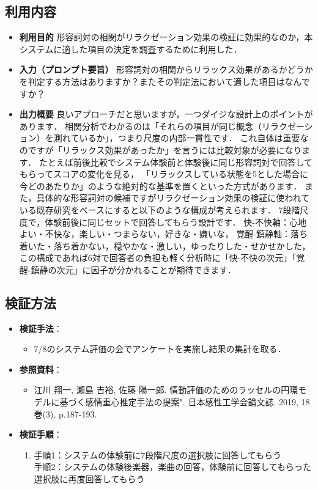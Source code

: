 \documentclass[a4paper,12pt]{ltjsarticle}
\begin{document}
\subsection{利用内容}
\begin{itemize}
  \item \textbf{利用目的}
  形容詞対の相関がリラクゼーション効果の検証に効果的なのか，本システムに適した項目の決定を調査するために利用した．
  \item \textbf{入力（プロンプト要旨）}
  形容詞対の相関からリラックス効果があるかどうかを判定する方法はありますか？またその判定法において適した項目はなんですか？
  \item \textbf{出力概要}
  良いアプローチだと思いますが，一つダイジな設計上のポイントがあります．
  相関分析でわかるのは「それらの項目が同じ概念（リラクゼーション）を測れているか」，つまり尺度の内部一貫性です．
  これ自体は重要なのですが「リラックス効果があったか」を言うには比較対象が必要になります．
  たとえば前後比較でシステム体験前と体験後に同じ形容詞対で回答してもらってスコアの変化を見る，
  「リラックスしている状態を5とした場合に今どのあたりか」のような絶対的な基準を置くといった方式があります．
  また，具体的な形容詞対の候補ですがリラクゼーション効果の検証に使われている既存研究をベースにすると以下のような構成が考えられます．
  7段階尺度で，体験前後に同じセットで回答してもらう設計です．
  快-不快軸：心地よい・不快な，楽しい・つまらない，好きな・嫌いな，
  覚醒-鎮静軸：落ち着いた・落ち着かない，穏やかな・激しい，ゆったりした・せかせかした，
  この構成であれば6対で回答者の負担も軽く分析時に「快-不快の次元」「覚醒-鎮静の次元」に因子が分かれることが期待できます．
\end{itemize}

\subsection{検証方法}

\begin{itemize}
  \item \textbf{検証手法}：
    \begin{itemize}
      \item
      7/8のシステム評価の会でアンケートを実施し結果の集計を取る．
    \end{itemize}
  \item \textbf{参照資料}：
    \begin{itemize}
      \item
      江川 翔一, 瀬島 吉裕, 佐藤 陽一郎. 情動評価のためのラッセルの円環モデルに基づく感情重心推定手法の提案". 日本感性工学会論文誌. 2019, 18巻(3), p.187-193. 
    \end{itemize}
  \item \textbf{検証手順}：
    \begin{enumerate}
      \item
      手順1：システムの体験前に7段階尺度の選択肢に回答してもらう \\
      手順2：システムの体験後楽器，楽曲の回答，体験前に回答してもらった選択肢に再度回答してもらう
    \end{enumerate}
\end{itemize}
\end{document}
